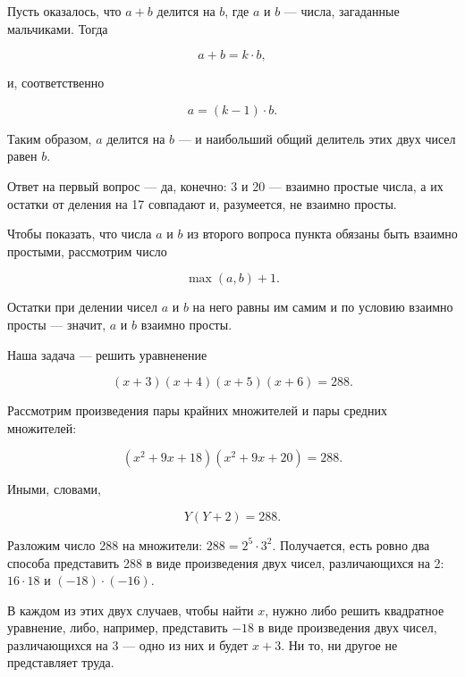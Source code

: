 \begin{itemize}

\itA Пусть оказалось, что $a+b$ делится на $b$, где $a$ и $b$ — числа, загаданные мальчиками. Тогда

\vspace{-0.4cm}
$$a+b = k \cdot b,$$

\noindent и, соответственно

\vspace{-0.4cm}
$$a = (k-1) \cdot b.$$

Таким образом, $a$ делится на $b$ — и наибольший общий делитель этих двух чисел равен $b$.

\itB Ответ на первый вопрос — да, конечно: 3 и 20 — взаимно простые числа, а их остатки от деления на 17 совпадают и, разумеется, не взаимно просты.

Чтобы показать, что числа $a$ и $b$ из второго вопроса пункта обязаны быть взаимно простыми, рассмотрим число

\vspace{-0.4cm}
$$\max (a,b) +1.$$

\noindent Остатки при делении чисел $a$ и $b$ на него равны им самим и по условию взаимно просты — значит, $a$ и $b$ взаимно просты.

\itC Наша задача — решить уравненение

\vspace{-0.4cm}
$$(x+3)(x+4)(x+5)(x+6) = 288.$$

\noindent Рассмотрим произведения пары крайних множителей и пары средних множителей:

\vspace{-0.4cm}
$$(x^2 + 9x + 18)(x^2 + 9x + 20) = 288.$$

Иными, словами,

\vspace{-0.4cm}
$$Y(Y+2) = 288.$$

\noindent Разложим число 288 на множители: $288 = 2^5 \cdot 3^2$. Получается, есть ровно два способа представить 288 в виде произведения двух чисел, различающихся на 2: $16 \cdot 18$ и $(-18) \cdot (-16)$.

\ms В каждом из этих двух случаев, чтобы найти $x$, нужно либо решить квадратное уравнение, либо, например, представить $-18$ в виде произведения двух чисел, различающихся на 3 — одно из них и будет $x+3$. Ни то, ни другое не представляет труда.

\end{itemize}